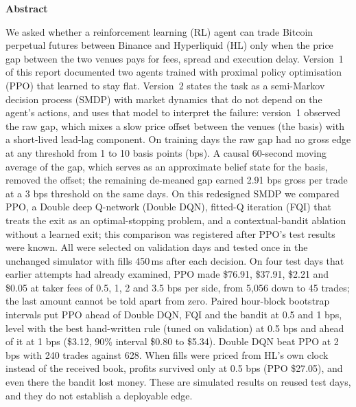 \documentclass[12pt,a4paper]{article}
\DeclareRobustCommand{\bps}{\ifmmode\,\text{bps}\else\,bps\fi}
\newcommand{\usd}[1]{\$#1}
\begin{document}
\setcounter{page}{1}

\label{bodystart}
\begin{center}{\large\bfseries Abstract}\end{center}
\vspace{-4pt}
We asked whether a reinforcement learning (RL) agent can trade Bitcoin perpetual futures
between Binance and Hyperliquid (HL) only when the price gap between the two venues pays for
fees, spread and execution delay. Version~1 of this report documented two agents trained with
proximal policy optimisation (PPO) that learned to stay flat. Version~2 states the task as a
semi-Markov decision process (SMDP) with
market dynamics that do not depend on the agent's actions, and uses that model to interpret
the failure: version~1 observed the raw gap, which mixes a slow price offset between the venues
(the basis) with a short-lived lead-lag component. On training days the raw gap had no gross
edge at any threshold from 1 to 10 basis points (bps). A causal 60-second moving average of
the gap, which serves as an approximate belief state for the basis, removed the offset; the
remaining de-meaned gap earned 2.91\bps{} gross per trade at a 3\bps{} threshold on the same
days. On this redesigned SMDP we compared PPO, a Double deep Q-network (Double DQN), fitted-Q
iteration (FQI) that treats the exit as an optimal-stopping problem, and a contextual-bandit
ablation without a learned exit; this comparison was registered after PPO's test results were
known. All were selected on validation days and tested once in the unchanged simulator with
fills 450\,ms after each decision. On four test days that earlier attempts had already
examined, PPO made \usd{76.91}, \usd{37.91}, \usd{2.21} and \usd{0.05} at taker fees of 0.5,
1, 2 and 3.5\bps{} per side, from 5,056 down to 45 trades; the last amount cannot be told
apart from zero. Paired hour-block bootstrap intervals put PPO ahead of Double DQN, FQI and
the bandit at 0.5 and 1\bps, level with the best hand-written rule (tuned on validation) at
0.5\bps{} and ahead of it at 1\bps{} (\usd{3.12}, 90\% interval \usd{0.80} to \usd{5.34}).
Double DQN beat PPO at 2\bps{} with 240 trades against 628. When fills were priced from HL's
own clock instead of the received book, profits survived only at 0.5\bps{} (PPO \usd{27.05}),
and even there the bandit lost money. These are simulated results on reused test days, and
they do not establish a deployable edge.
\end{document}
